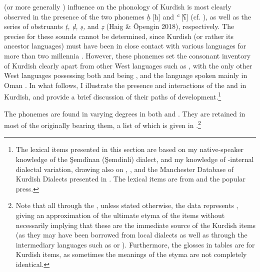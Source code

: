 \documentclass[output=paper]{langsci/langscibook}
\begin{document}
 (or more generally ) influence on the phonology of Kurdish is most clearly observed in the presence of the two  phonemes \textit{ḥ} [ħ] and \textit{ʿ} [ʕ] (cf. \citealt{Kahn1976,Haig2007,Anonbyforthcoming,Barryforthcoming}), as well as the series of  obstruants \textit{ṭ,} \textit{ḍ,} \textit{ṣ,} and \textit{ẓ} (Haig \& Öpengin 2018), respectively. The precise   for these sounds cannot be determined, since Kurdish (or rather its ancestor languages) must have been in close contact with various  languages for more than two millennia \citep[69]{Utas2005}. However, these phonemes set the consonant inventory of Kurdish clearly apart from other West  languages such as , with the only other West  languages possessing both  and  being , and the  language spoken mainly in Oman \citep{Anonbyforthcoming}. In what follows, I illustrate the presence and interactions of the  and  in Kurdish, and provide a brief discussion of their paths of development.\footnote{The  lexical items presented in this section are based on my native-speaker knowledge of the Şemdînan (Şemdinli) dialect, and my knowledge of -internal dialectal variation, drawing also on \citep{Chyet2003}, \citep{ÖpenginHaig2014}, and the  Manchester Database of Kurdish Dialects presented in \citet{MatrasKoontz-Garboden2016}. The  lexical items are from \citet{Öpengin2016} and the popular press.}  

The  phonemes are found in varying degrees in both  and . They are retained in most of the   originally bearing them, a list of which is given in .\footnote{Note that all through the , unless stated otherwise, the  data represents  , giving an approximation of the ultimate  etyma of the items without necessarily implying that these are the immediate source of the Kurdish items (as they may have been borrowed from local  dialects as well as through the intermediary languages such as  or ). Furthermore, the glosses in tables are for Kurdish items, as sometimes the meanings of the  etyma are not completely identical.} 
\end{document}
